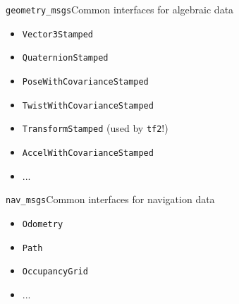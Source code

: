 \begin{frame}{\texttt{geometry\_msgs}}{Common interfaces for algebraic data}
  \begin{itemize}
    \item \texttt{Vector3Stamped}
    \item \texttt{QuaternionStamped}
    \item \texttt{PoseWithCovarianceStamped}
    \item \texttt{TwistWithCovarianceStamped}
    \item \texttt{TransformStamped} (used by \texttt{tf2}!)
    \item \texttt{AccelWithCovarianceStamped}
    \item ...
  \end{itemize}
\end{frame}

\begin{frame}{\texttt{nav\_msgs}}{Common interfaces for navigation data}
  \begin{itemize}
    \item \texttt{Odometry}
    \item \texttt{Path}
    \item \texttt{OccupancyGrid}
    \item ...
  \end{itemize}
\end{frame}
